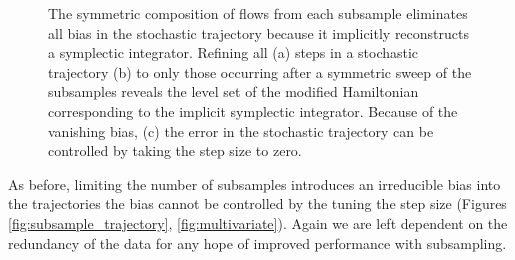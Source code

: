 \documentclass{article}
\begin{document}
\begin{figure}
\centering
{}
\caption{The symmetric composition of flows from each subsample eliminates
all bias in the stochastic trajectory because it implicitly reconstructs a symplectic
integrator.  Refining all (a) steps in a stochastic trajectory (b) to
only those occurring after a symmetric sweep of the subsamples reveals
the level set of the modified Hamiltonian corresponding to the implicit
symplectic integrator.  Because of the vanishing bias, (c) the error in the
stochastic trajectory can be controlled by taking the step size to zero. }
\label{fig:symmetric_stochastic}
\end{figure}

As before, limiting the number of subsamples introduces an irreducible bias
into the trajectories the bias cannot be controlled by the tuning the step size
(Figures \ref{fig:subsample_trajectory}, \ref{fig:multivariate}).  Again we are 
left dependent on the redundancy of the data for any hope of improved 
performance with subsampling.
\end{document}
